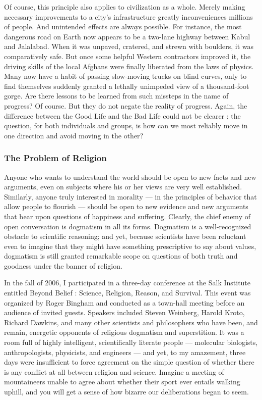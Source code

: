 \documentclass[a4paper,14pt]{extbook}
\begin{document}
Of course, this principle also applies to civilization as a whole.
Merely making necessary improvements to a city's infrastructure greatly inconveniences millions of people.
And unintended effects are always possible.
For instance, the most dangerous road on Earth now appears to be a two-lane highway between Kabul and Jalalabad.
When it was unpaved, cratered, and strewn with boulders, it was comparatively safe.
But once some helpful Western contractors improved it, the driving skills of the local Afghans were finally liberated from the laws of physics.
Many now have a habit of passing slow-moving trucks on blind curves, only to find themselves suddenly granted a lethally unimpeded view of a thousand-foot gorge.
Are there lessons to be learned from such missteps in the name of progress?
Of course.
But they do not negate the reality of progress.
Again, the difference between the Good Life and the Bad Life could not be clearer :
the question, for both individuals and groups, is how can we most reliably move in one direction and avoid moving in the other?

\subsubsection{The Problem of Religion}

Anyone who wants to understand the world should be open to new facts and new arguments, even on subjects where his or her views are very well established.
Similarly, anyone truly interested in morality --- in the principles of behavior that allow people to flourish --- should be open to new evidence and new arguments that bear upon questions of happiness and suffering.
Clearly, the chief enemy of open conversation is dogmatism in all its forms.
Dogmatism is a well-recognized obstacle to scientific reasoning;
and yet, because scientists have been reluctant even to imagine that they might have something prescriptive to say about values, dogmatism is still granted remarkable scope on questions of both truth and goodness under the banner of religion.

In the fall of 2006, I participated in a three-day conference at the Salk Institute entitled Beyond Belief : Science, Religion, Reason, and Survival.
This event was organized by Roger Bingham and conducted as a town-hall meeting before an audience of invited guests.
Speakers included Steven Weinberg, Harold Kroto, Richard Dawkins, and many other scientists and philosophers who have been, and remain, energetic opponents of religious dogmatism and superstition.
It was a room full of highly intelligent, scientifically literate people --- molecular biologists, anthropologists, physicists, and engineers --- and yet, to my amazement, three days were insufficient to force agreement on the simple question of whether there is any conflict at all between religion and science.
Imagine a meeting of mountaineers unable to agree about whether their sport ever entails walking uphill, and you will get a sense of how bizarre our deliberations began to seem.
\end{document}
